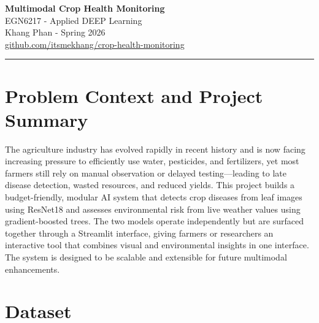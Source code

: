 \documentclass[11pt, letterpaper]{article}
\begin{document}
\begin{center}
  {\LARGE\bfseries Multimodal Crop Health Monitoring}\\[6pt]
  {\large EGN6217 - Applied DEEP Learning}\\[10pt]
  {\normalsize Khang Phan - Spring 2026}\\[4pt]
  {\small \href{https://github.com/itsmekhang/crop-health-monitoring}{github.com/itsmekhang/crop-health-monitoring}}
\end{center}

\vspace{0.5em}
\hrule
\vspace{1em}

\section{Problem Context and Project Summary}

The agriculture industry has evolved rapidly in recent history and is now facing increasing pressure to efficiently use water, pesticides, and fertilizers, yet most farmers still rely on manual observation or delayed testing—leading to late disease detection, wasted resources, and reduced yields. This project builds a budget-friendly, modular AI system that detects crop diseases from leaf images using ResNet18 and assesses environmental risk from live weather values using gradient-boosted trees. The two models operate independently but are surfaced together through a Streamlit interface, giving farmers or researchers an interactive tool that combines visual and environmental insights in one interface. The system is designed to be scalable and extensible for future multimodal enhancements.

\section{Dataset}
\end{document}
